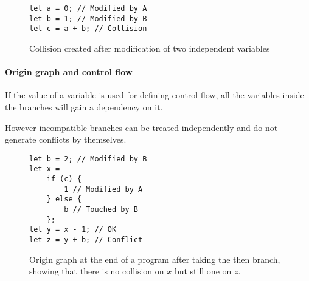 \documentclass[a4paper,10pt]{article}
\begin{document}
\begin{figure}[ht]
\begin{minipage}{.5\textwidth}
\begin{lstlisting}
let a = 0; // Modified by A
let b = 1; // Modified by B
let c = a + b; // Collision
\end{lstlisting}
\end{minipage}\hfill
\begin{minipage}{.45\textwidth}
\centering{}
\end{minipage}
\caption{Collision created after modification of two independent variables}
\end{figure}
\FloatBarrier

\paragraph{Origin graph and control flow} If the value of a variable is used for defining control flow, all the variables inside the branches will gain a dependency on it.

However incompatible branches can be treated independently and do not generate conflicts by themselves.

\begin{figure}[ht]
\begin{minipage}{.5\textwidth}
\begin{lstlisting}
let b = 2; // Modified by B
let x =
    if (c) {
        1 // Modified by A
    } else {
        b // Touched by B
    };
let y = x - 1; // OK
let z = y + b; // Conflict
\end{lstlisting}
\end{minipage}\hfill
\begin{minipage}{.45\textwidth}
\centering{}
\end{minipage}
\caption{Origin graph at the end of a program after taking the then branch, showing that there is no collision on $x$ but still one on $z$.}
\label{fig:origin_graph_branches}
\end{figure}
\end{document}
